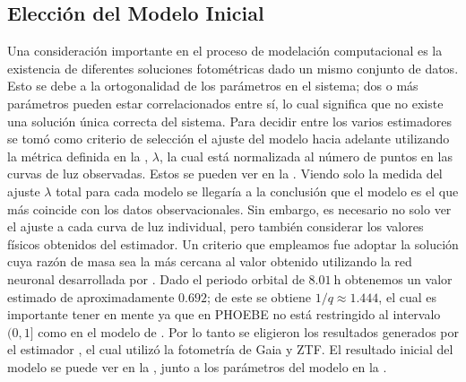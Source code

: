 \subsection{Elección del Modelo Inicial}

Una consideración importante en el proceso de modelación computacional es la
existencia de diferentes soluciones fotométricas dado un mismo conjunto de
datos. Esto se debe a la ortogonalidad de los parámetros en el sistema; dos o
más parámetros pueden estar correlacionados entre sí, lo cual significa que no
existe una solución única correcta del sistema. Para decidir entre los varios
estimadores se tomó como criterio de selección el ajuste del modelo hacia
adelante utilizando la métrica definida en la
, $\lambda$, la cual está normalizada al
número de puntos en las curvas de luz observadas. Estos se pueden ver en la
. Viendo solo la medida del ajuste $\lambda$
total para cada modelo se llegaría a la conclusión que el modelo
 es el que más coincide con los datos
observacionales. Sin embargo, es necesario no solo ver el ajuste a cada curva de
luz individual, pero también considerar los valores físicos obtenidos del
estimador. Un criterio que empleamos fue adoptar la solución cuya razón de masa
 sea la más cercana al valor obtenido utilizando la red neuronal
desarrollada por
. Dado
el periodo orbital de $8.01 \ \mathrm{h}$ obtenemos un valor estimado de
aproximadamente $0.692$; de este se obtiene $1/q \approx 1.444$, el cual es
importante tener en mente ya que  en PHOEBE no está restringido al
intervalo $(0, 1]$ como en el modelo de
. Por lo
tanto se eligieron los resultados generados por el estimador
, el cual utilizó la fotometría de Gaia y
ZTF. El resultado inicial del modelo se puede ver en la
, junto a los parámetros del modelo en
la .

